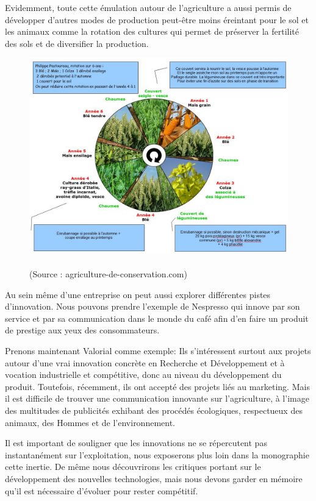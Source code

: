 \documentclass[a4paper,12pt]{report}
\begin{document}
			Evidemment, toute cette émulation autour de l’agriculture a aussi permis de développer d’autres modes de production peut-être moins éreintant pour le sol et les animaux comme la rotation des cultures qui permet de préserver la fertilité des sols et de diversifier la production.
			
			\begin{figure}[!h]
			\centering
			\includegraphics[scale=0.6]{Illustrations/Rotation.jpg}
			\caption{\\(Source : agriculture-de-conservation.com\cite{RotationSite})}
			\label{Rotation}
			\end{figure}
			
			Au sein même d’une entreprise on peut aussi explorer différentes pistes d'innovation. Nous pouvons prendre l’exemple de Nespresso qui innove par son service et par sa communication dans le monde du café afin d’en faire un produit de prestige aux yeux des consommateurs.
			
			Prenons maintenant Valorial comme exemple: Ils s'intéressent surtout aux projets autour d'une vrai innovation concrète en Recherche et Développement et à vocation industrielle et compétitive, donc au niveau du développement du produit. Toutefois, récemment, ils ont accepté des projets liés au marketing. Mais il est difficile de trouver une communication innovante sur l'agriculture, à l'image des multitudes de publicités exhibant des procédés écologiques, respectueux des animaux, des Hommes et de l'environnement. 
			
			Il est important de souligner que les innovations ne se répercutent pas instantanément sur l'exploitation, nous exposerons plus loin dans la monographie cette inertie. De même nous découvrirons les critiques portant sur le développement des nouvelles technologies, mais nous devons garder en mémoire qu’il est nécessaire d’évoluer pour rester compétitif.
			
\end{document}
